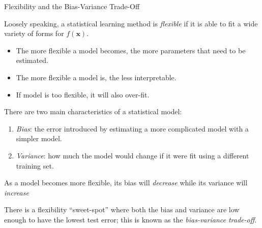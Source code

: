 \documentclass[8pt]{beamer}
\newcommand{\mydef}[1]{\textcolor{SteelBlue3}{\textit{#1}}} %
\begin{document}
 
\begin{frame}{Flexibility and the Bias-Variance Trade-Off}

Loosely speaking, a statistical learning method is \mydef{flexible} if it is able to fit a wide variety of forms for $f(\bm{x})$. 
\begin{itemize}
    \item The more flexible a model becomes, the more parameters that need to be estimated.
    \item The more flexible a model is, the less interpretable. 
    \item If model is too flexible, it will also over-fit. 
\end{itemize}

There are two main characteristics of a statistical model: 
\begin{enumerate}
    \item \mydef{Bias}: the error introduced by estimating a more complicated model with a simpler model. 
    \item \mydef{Variance}: how much the model would change if it were fit using a different training set. 
\end{enumerate}

As a model becomes more flexible, its bias will \textit{decrease} while its variance will \textit{increase} 

There is a flexibility ``sweet-spot'' where both the bias and variance are low enough to have the lowest test error; this is known as the \mydef{bias-variance trade-off}.
    
\end{frame}
\end{document}

